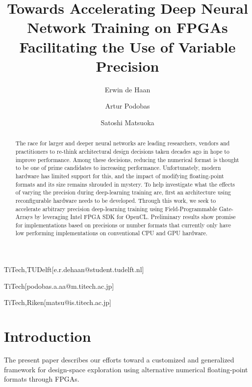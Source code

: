 \documentclass[techrep,english]{ipsj} %
\begin{document}
\title{Towards Accelerating Deep Neural Network Training on FPGAs Facilitating the Use of Variable Precision}



\author{Erwin de Haan}{TiTech,TUDelft}[e.r.dehaan@student.tudelft.nl]
\author{Artur Podobas}{TiTech}[podobas.a.aa@m.titech.ac.jp]
\author{Satoshi Matsuoka}{TiTech,Riken}[matsu@is.titech.ac.jp]

\begin{abstract}
The race for larger and deeper neural networks are leading researchers, vendors and practitioners to re-think architectural design decisions taken decades ago in hope to improve performance.
Among these decisions, reducing the numerical format is thought to be one of prime candidates to increasing performance.
Unfortunately, modern hardware has limited support for this, and the impact of modifying floating-point formats and its size remains shrouded in mystery.
To help investigate what the effects of varying the precision during deep-learning training are, first an architecture using reconfigurable hardware needs to be developed.
Through this work, we seek to accelerate arbitrary precision deep-learning training using Field-Programmable Gate-Arrays by leveraging Intel FPGA SDK for OpenCL.
Preliminary results show promise for implementations based on precisions or number formats that currently only have low performing implementations on conventional CPU and GPU hardware.
\end{abstract}


\maketitle

\section{Introduction}
The present paper describes our efforts toward a customized and generalized framework for design-space exploration using alternative numerical floating-point formats through FPGAs.
\end{document}

